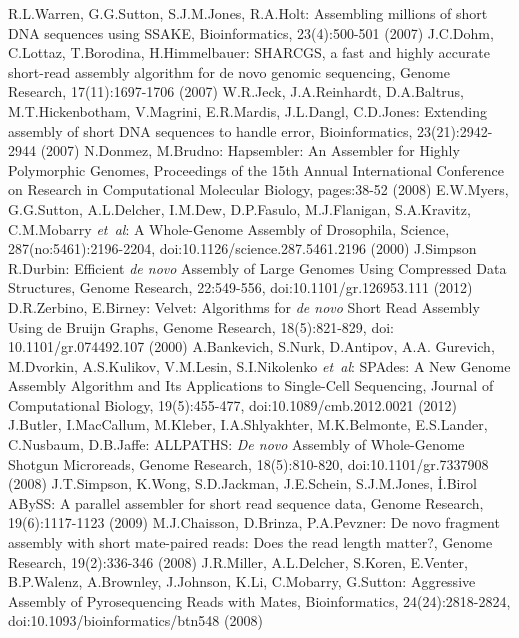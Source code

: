 \documentclass{llncs}
\begin{document}
%
%
\begin{thebibliography}{}
%

 R.L.Warren, G.G.Sutton, S.J.M.Jones, R.A.Holt: Assembling millions of short DNA sequences using SSAKE, Bioinformatics, 23(4):500-501 (2007)
 J.C.Dohm, C.Lottaz, T.Borodina, H.Himmelbauer: SHARCGS, a fast and highly accurate short-read assembly algorithm for de novo genomic sequencing, Genome Research, 17(11):1697-1706 (2007)
 W.R.Jeck, J.A.Reinhardt, D.A.Baltrus, M.T.Hickenbotham, V.Magrini, E.R.Mardis, J.L.Dangl, C.D.Jones: Extending assembly of short DNA sequences to handle error, Bioinformatics, 23(21):2942-2944 (2007)
 N.Donmez, M.Brudno: Hapsembler: An Assembler for Highly Polymorphic Genomes, Proceedings of the 15th Annual International Conference on Research in Computational Molecular Biology, pages:38-52 (2008)
 E.W.Myers, G.G.Sutton, A.L.Delcher, I.M.Dew, D.P.Fasulo, M.J.Flanigan, S.A.Kravitz, C.M.Mobarry \textit{et~al}: A Whole-Genome Assembly of Drosophila, Science, {287(no:5461)}:2196-2204, doi:10.1126/science.287.5461.2196 (2000)
 J.Simpson R.Durbin: Efficient \textit{de novo} Assembly of Large Genomes Using Compressed Data Structures, Genome Research, {22}:549-556, doi:10.1101/gr.126953.111 (2012)
 D.R.Zerbino, E.Birney: Velvet: Algorithms for \textit{de novo} Short Read Assembly Using de Bruijn Graphs, Genome Research, {18(5)}:821-829, doi: 10.1101/gr.074492.107 (2000)
 A.Bankevich, S.Nurk, D.Antipov, A.A. Gurevich, M.Dvorkin, A.S.Kulikov, V.M.Lesin, S.I.Nikolenko {\it et~al}: SPAdes: A New Genome Assembly Algorithm and Its Applications to Single-Cell Sequencing, Journal of Computational Biology, {19(5)}:455-477, doi:10.1089/cmb.2012.0021 (2012)
 J.Butler, I.MacCallum, M.Kleber, I.A.Shlyakhter, M.K.Belmonte, E.S.Lander, C.Nusbaum, D.B.Jaffe: ALLPATHS: \textit{De novo} Assembly of Whole-Genome Shotgun Microreads, Genome Research, {18(5)}:810-820, doi:10.1101/gr.7337908 (2008)
 J.T.Simpson, K.Wong, S.D.Jackman, J.E.Schein, S.J.M.Jones, İ.Birol ABySS: A parallel assembler for short read sequence data, Genome Research, 19(6):1117-1123 (2009)
 M.J.Chaisson, D.Brinza, P.A.Pevzner: De novo fragment assembly with short mate-paired reads: Does the read length matter?, Genome Research, 19(2):336-346 (2008)
 J.R.Miller, A.L.Delcher, S.Koren, E.Venter, B.P.Walenz, A.Brownley, J.Johnson, K.Li, C.Mobarry, G.Sutton: Aggressive Assembly of Pyrosequencing Reads with Mates, Bioinformatics, {24(24)}:2818-2824, doi:10.1093/bioinformatics/btn548 (2008)

\end{thebibliography}
\end{document}

